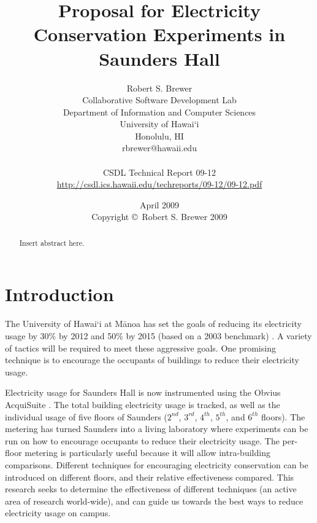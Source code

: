 \documentclass[11pt]{article}
\begin{document}
\title{Proposal for Electricity Conservation Experiments in Saunders Hall}
\author{Robert S. Brewer \\
Collaborative Software Development Lab \\
Department of Information and Computer Sciences \\
University of Hawai`i \\
Honolulu, HI \\
rbrewer@hawaii.edu \\
\\
CSDL Technical Report 09-12 \\
\url{http://csdl.ics.hawaii.edu/techreports/09-12/09-12.pdf}
}
\date{April 2009\\[3pt]
Copyright \copyright\ Robert S. Brewer 2009}

\maketitle


\begin{abstract}
Insert abstract here.
\end{abstract}

\section{Introduction}

The University of Hawai`i at M\=anoa has set the goals of reducing its electricity usage by 30\% by 2012 and 50\% by 2015 (based on a 2003 benchmark) \cite{Moreno2006UHM-energy-goals, 2007UHM-HECO-pr}. A variety of tactics will be required to meet these aggressive goals. One promising technique is to encourage the occupants of buildings to reduce their electricity usage.

Electricity usage for Saunders Hall is now instrumented using the Obvius AcquiSuite \cite{ObviusAcquiSuite}. The total building electricity usage is tracked, as well as the individual usage of five floors of Saunders ($2^{nd}$, $3^{rd}$, $4^{th}$, $5^{th}$, and $6^{th}$ floors). The metering has turned Saunders into a living laboratory where experiments can be run on how to encourage occupants to reduce their electricity usage. The per-floor metering is particularly useful because it will allow intra-building comparisons. Different techniques for encouraging electricity conservation can be introduced on different floors, and their relative effectiveness compared. This research seeks to determine the effectiveness of different techniques (an active area of research world-wide), and can guide us towards the best ways to reduce electricity usage on campus.
\end{document}
